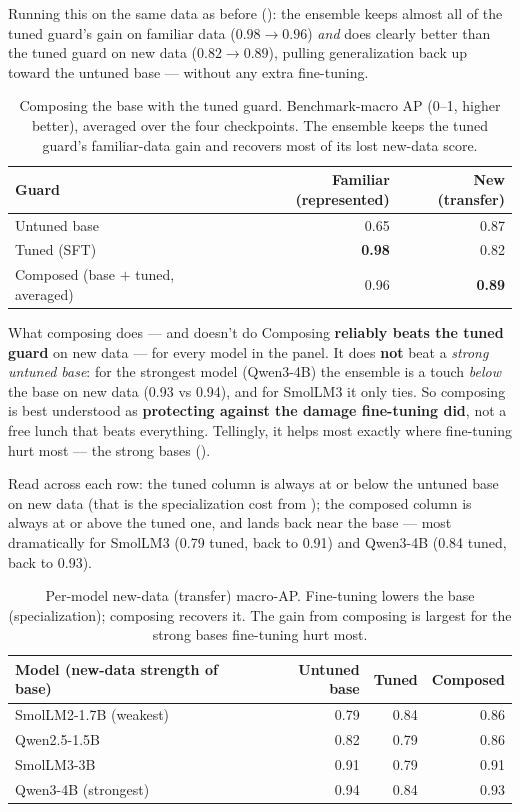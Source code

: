 \documentclass[11pt]{article}
\begin{document}
Running this on the same data as before (): the ensemble keeps almost all of
the tuned guard's gain on familiar data ($0.98 \to 0.96$) \emph{and} does clearly better than
the tuned guard on new data ($0.82 \to 0.89$), pulling generalization back up toward the untuned
base --- without any extra fine-tuning.

\begin{table}[t]
\centering\small
\caption{Composing the base with the tuned guard. Benchmark-macro AP (0--1, higher better),
averaged over the four checkpoints. The ensemble keeps the tuned guard's familiar-data gain and
recovers most of its lost new-data score.}
\label{tab:compose}
\begin{tabular}{lrr}
\toprule
Guard & Familiar (represented) & New (transfer) \\
\midrule
Untuned base & 0.65 & 0.87 \\
Tuned (SFT) & \textbf{0.98} & 0.82 \\
Composed (base $+$ tuned, averaged) & 0.96 & \textbf{0.89} \\
\bottomrule
\end{tabular}
\end{table}

\begin{takeaway}{What composing does --- and doesn't do}
\small
Composing \textbf{reliably beats the tuned guard} on new data --- for every model in the panel.
It does \textbf{not} beat a \emph{strong untuned base}: for the strongest model (Qwen3-4B) the
ensemble is a touch \emph{below} the base on new data (0.93 vs 0.94), and for SmolLM3 it only
ties. So composing is best understood as \textbf{protecting against the damage fine-tuning did},
not a free lunch that beats everything. Tellingly, it helps most exactly where fine-tuning hurt
most --- the strong bases ().
\end{takeaway}

Read  across each row: the tuned column is always at or below the untuned
base on new data (that is the specialization cost from ); the composed column
is always at or above the tuned one, and lands back near the base --- most dramatically for
SmolLM3 (0.79 tuned, back to 0.91) and Qwen3-4B (0.84 tuned, back to 0.93).

\begin{table}[t]
\centering\small
\caption{Per-model new-data (transfer) macro-AP. Fine-tuning lowers the base (specialization);
composing recovers it. The gain from composing is largest for the strong bases fine-tuning hurt
most.}
\label{tab:composeperm}
\begin{tabular}{lrrr}
\toprule
Model (new-data strength of base) & Untuned base & Tuned & Composed \\
\midrule
SmolLM2-1.7B (weakest) & 0.79 & 0.84 & 0.86 \\
Qwen2.5-1.5B & 0.82 & 0.79 & 0.86 \\
SmolLM3-3B & 0.91 & 0.79 & 0.91 \\
Qwen3-4B (strongest) & 0.94 & 0.84 & 0.93 \\
\bottomrule
\end{tabular}
\end{table}
\end{document}

